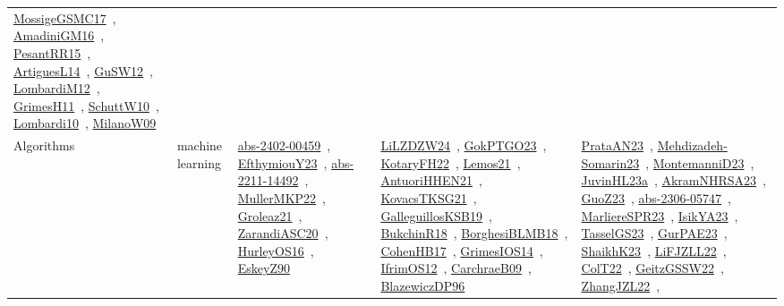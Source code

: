 {\begin{longtable}{lp{3cm}>{\raggedright\arraybackslash}p{6cm}>{\raggedright\arraybackslash}p{6cm}>{\raggedright\arraybackslash}p{8cm}}
\href{../works/MossigeGSMC17.pdf}{MossigeGSMC17}~\cite{MossigeGSMC17}, \href{../works/AmadiniGM16.pdf}{AmadiniGM16}~\cite{AmadiniGM16}, \href{../works/PesantRR15.pdf}{PesantRR15}~\cite{PesantRR15}, \href{../works/ArtiguesL14.pdf}{ArtiguesL14}~\cite{ArtiguesL14}, \href{../works/GuSW12.pdf}{GuSW12}~\cite{GuSW12}, \href{../works/LombardiM12.pdf}{LombardiM12}~\cite{LombardiM12}, \href{../works/GrimesH11.pdf}{GrimesH11}~\cite{GrimesH11}, \href{../works/SchuttW10.pdf}{SchuttW10}~\cite{SchuttW10}, \href{../works/Lombardi10.pdf}{Lombardi10}~\cite{Lombardi10}, \href{../works/MilanoW09.pdf}{MilanoW09}~\cite{MilanoW09}\\
Algorithms & machine learning & \href{../works/abs-2402-00459.pdf}{abs-2402-00459}~\cite{abs-2402-00459}, \href{../works/EfthymiouY23.pdf}{EfthymiouY23}~\cite{EfthymiouY23}, \href{../works/abs-2211-14492.pdf}{abs-2211-14492}~\cite{abs-2211-14492}, \href{../works/MullerMKP22.pdf}{MullerMKP22}~\cite{MullerMKP22}, \href{../works/Groleaz21.pdf}{Groleaz21}~\cite{Groleaz21}, \href{../works/ZarandiASC20.pdf}{ZarandiASC20}~\cite{ZarandiASC20}, \href{../works/HurleyOS16.pdf}{HurleyOS16}~\cite{HurleyOS16}, \href{../works/EskeyZ90.pdf}{EskeyZ90}~\cite{EskeyZ90} & \href{../works/LiLZDZW24.pdf}{LiLZDZW24}~\cite{LiLZDZW24}, \href{../works/GokPTGO23.pdf}{GokPTGO23}~\cite{GokPTGO23}, \href{../works/KotaryFH22.pdf}{KotaryFH22}~\cite{KotaryFH22}, \href{../works/Lemos21.pdf}{Lemos21}~\cite{Lemos21}, \href{../works/AntuoriHHEN21.pdf}{AntuoriHHEN21}~\cite{AntuoriHHEN21}, \href{../works/KovacsTKSG21.pdf}{KovacsTKSG21}~\cite{KovacsTKSG21}, \href{../works/GalleguillosKSB19.pdf}{GalleguillosKSB19}~\cite{GalleguillosKSB19}, \href{../works/BukchinR18.pdf}{BukchinR18}~\cite{BukchinR18}, \href{../works/BorghesiBLMB18.pdf}{BorghesiBLMB18}~\cite{BorghesiBLMB18}, \href{../works/CohenHB17.pdf}{CohenHB17}~\cite{CohenHB17}, \href{../works/GrimesIOS14.pdf}{GrimesIOS14}~\cite{GrimesIOS14}, \href{../works/IfrimOS12.pdf}{IfrimOS12}~\cite{IfrimOS12}, \href{../works/CarchraeB09.pdf}{CarchraeB09}~\cite{CarchraeB09}, \href{../works/BlazewiczDP96.pdf}{BlazewiczDP96}~\cite{BlazewiczDP96} & \href{../works/PrataAN23.pdf}{PrataAN23}~\cite{PrataAN23}, \href{../works/Mehdizadeh-Somarin23.pdf}{Mehdizadeh-Somarin23}~\cite{Mehdizadeh-Somarin23}, \href{../works/MontemanniD23.pdf}{MontemanniD23}~\cite{MontemanniD23}, \href{../works/JuvinHL23a.pdf}{JuvinHL23a}~\cite{JuvinHL23a}, \href{../works/AkramNHRSA23.pdf}{AkramNHRSA23}~\cite{AkramNHRSA23}, \href{../works/GuoZ23.pdf}{GuoZ23}~\cite{GuoZ23}, \href{../works/abs-2306-05747.pdf}{abs-2306-05747}~\cite{abs-2306-05747}, \href{../works/MarliereSPR23.pdf}{MarliereSPR23}~\cite{MarliereSPR23}, \href{../works/IsikYA23.pdf}{IsikYA23}~\cite{IsikYA23}, \href{../works/TasselGS23.pdf}{TasselGS23}~\cite{TasselGS23}, \href{../works/GurPAE23.pdf}{GurPAE23}~\cite{GurPAE23}, \href{../works/ShaikhK23.pdf}{ShaikhK23}~\cite{ShaikhK23}, \href{../works/LiFJZLL22.pdf}{LiFJZLL22}~\cite{LiFJZLL22}, \href{../works/ColT22.pdf}{ColT22}~\cite{ColT22}, \href{../works/GeitzGSSW22.pdf}{GeitzGSSW22}~\cite{GeitzGSSW22}, \href{../works/ZhangJZL22.pdf}{ZhangJZL22}~\cite{ZhangJZL22}, 
\end{longtable}}
